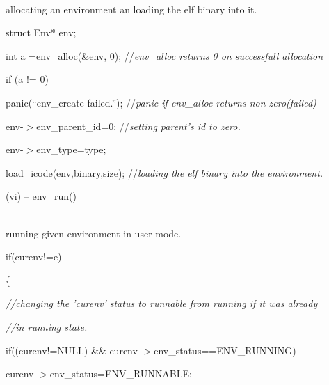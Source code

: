 \documentclass[a4paper,portrait,12pt]{article}
\begin{document}
\textcolor[rgb]{0.000,0.000,0.000}{\\allocating an environment an loading the elf binary into it.}





\textcolor[rgb]{0.000,0.000,0.000}{	}\textcolor[rgb]{0.000,0.000,0.000}{struct Env* env;}


\textcolor[rgb]{0.000,0.000,0.000}{	int a =env\_alloc(\&env, 0);  //}\emph{\textcolor[rgb]{0.000,0.000,0.000}{env\_alloc returns 0 on successfull allocation}}


\textcolor[rgb]{0.000,0.000,0.000}{	if (a != 0)}


\textcolor[rgb]{0.000,0.000,0.000}{		panic({``}env\_create failed.''); //}\emph{\textcolor[rgb]{0.000,0.000,0.000}{panic if env\_alloc returns non-zero(failed)}}


\textcolor[rgb]{0.000,0.000,0.000}{	env-$>$env\_parent\_id=0;   //}\emph{\textcolor[rgb]{0.000,0.000,0.000}{setting parent's id to zero.}}




\textcolor[rgb]{0.000,0.000,0.000}{	env-$>$env\_type=type;}


\textcolor[rgb]{0.000,0.000,0.000}{	load\_icode(env,binary,size); //}\emph{\textcolor[rgb]{0.000,0.000,0.000}{loading the elf binary into the environment.}}





\textcolor[rgb]{0.000,0.000,0.000}{(vi) -- env\_run()}


\textcolor[rgb]{0.000,0.000,0.000}{\\running given environment in user mode.}





\textcolor[rgb]{0.000,0.000,0.000}{	}\textcolor[rgb]{0.000,0.000,0.000}{if(curenv!=e)}


\textcolor[rgb]{0.000,0.000,0.000}{	\{}


\textcolor[rgb]{0.000,0.000,0.000}{		}\emph{\textcolor[rgb]{0.000,0.000,0.000}{//changing the 'curenv' status to runnable from running if it was already}}


\emph{\textcolor[rgb]{0.000,0.000,0.000}{		//in running state.}}





\textcolor[rgb]{0.000,0.000,0.000}{		if((curenv!=NULL) \&\& curenv-$>$env\_status==ENV\_RUNNING)}


\textcolor[rgb]{0.000,0.000,0.000}{			curenv-$>$env\_status=ENV\_RUNNABLE;}
\end{document}
